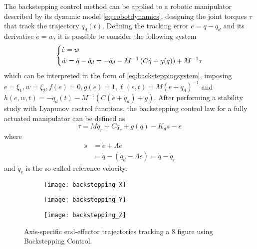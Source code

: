 The backstepping control method can be applied to a robotic manipulator described by its dynamic model \eqref{eq:robotdynamics}, designing the joint torques $\tau$ that track the trajectory $q_d(t)$. Defining the tracking error $e=q-q_d$ and its derivative $\dot{e}=w$, it is possible to consider the following system
\begin{equation}
\begin{dcases}
\dot{e} = w\\
\dot{w} = \ddot{q}-\ddot{q}_d = -\ddot{q}_d - M^{-1}\left(C\dot{q}+g(q)\right) + M^{-1}\tau
\end{dcases}
\label{eq:lagrangianbackstepping}
\end{equation}
which can be interpreted in the form of \eqref{eq:backsteppingsystem}, imposing $e=\xi_1, w=\xi_2, f(e)=0, g(e)=1, \ell(e,t)=M(e+q_d)^{-1}$ and $h(e,w,t)=-\ddot{q}_d(t)-M^{-1}\left(C(\dot{e}+\dot{q}_d)+g\right)$. After performing a stability study with Lyapunov control functions, the backstepping control law for a fully actuated manipulator can be defined as
\begin{equation}
\tau = M\ddot{q}_r + C\dot{q}_r + g(q) - K_{d}s - e
\label{eq:backsteppingcontrollaw}
\end{equation}
where
\begin{align*}
s &= \dot{e} + \Lambda{e}\\
&= \dot{q} - (\dot{q}_d - \Lambda{e}) = \dot{q} - \dot{q}_r
\end{align*}
and $\dot{q}_r$ is the so-called reference velocity. 

\begin{figure}
	\centering
	\begin{subfigure}[t]{0.9\textwidth}
		\centering
		\texttt{[image: backstepping\_X]}
	\end{subfigure}
	\begin{subfigure}[t]{0.9\textwidth}
		\centering
		\texttt{[image: backstepping\_Y]}
	\end{subfigure}
	\begin{subfigure}[t]{0.9\textwidth}
		\centering
		\texttt{[image: backstepping\_Z]}
	\end{subfigure}
	\caption{Axis-specific end-effector trajectories tracking a 8 figure using Backstepping Control.}
\end{figure}


